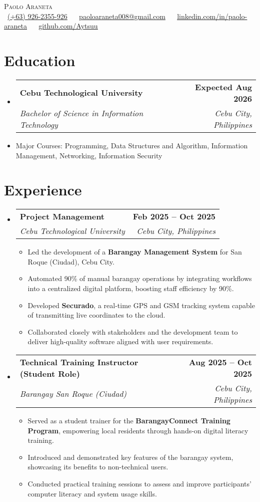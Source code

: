 \documentclass[letterpaper,11pt]{article}
\makeatletter
\newcommand{\resumeItem}[1]{
  \item\small{
    {#1 \vspace{0pt}}
  }
}
\newcommand{\resumeSubheading}[4]{
  \vspace{-2pt}\item
    \begin{tabular*}{1.0\textwidth}[t]{l@{\extracolsep{\fill}}r}
      \textbf{#1} & \textbf{\small #2} \\
      \textit{\small#3} & \textit{\small #4} \\
    \end{tabular*}\vspace{-7pt}
}
\newcommand{\resumeSubHeadingListStart}{\begin{itemize}[leftmargin=0.0in, label={}]}
\newcommand{\resumeSubHeadingListEnd}{\end{itemize}}\vspace{0pt}
\newcommand{\resumeItemListStart}{\begin{itemize}}
\newcommand{\resumeItemListEnd}{\end{itemize}\vspace{-5pt}}
\makeatother
\begin{document}
\begin{center}
    {\Large \scshape Paolo Araneta} \\[2mm]
    \footnotesize \raisebox{-0.1\height}
    \faPhone\ \underline{(+63) 926-2355-926} ~ 
    {\faEnvelope\  \underline{paoloaraneta008@gmail.com}} ~ 
    {\faLinkedin\ \underline{\href{https://www.linkedin.com/in/paolo-araneta-65b332336/}{linkedin.com/in/paolo-araneta}}} ~
    {\faGithub\ \underline{\href{https://github.com/Aytsuu}{github.com/Aytsuu}}} ~
\end{center}

\section{Education}
  \resumeSubHeadingListStart
    \resumeSubheading
      {Cebu Technological University}{Expected Aug 2026}
      {Bachelor of Science in Information Technology
      }{Cebu City, Philippines}
  \resumeSubHeadingListEnd
    \resumeItemListStart
        \vspace{-7pt}
        \resumeItem {Major Courses: Programming, Data Structures and Algorithm, Information Management, Networking, Information Security}
    \resumeItemListEnd
    \vspace{-12pt}
\section{Experience}
    \resumeSubHeadingListStart
      \resumeSubheading{Project Management}{Feb 2025 -- Oct 2025}{Cebu Technological University}{Cebu City, Philippines} 
        \resumeItemListStart
          \resumeItem{Led the development of a \textbf{Barangay Management System} for San Roque (Ciudad), Cebu City.}
          \resumeItem{Automated 90\% of manual barangay operations by integrating workflows into a centralized digital platform, boosting staff efficiency by 90\%.}
          \resumeItem{Developed \textbf{Securado}, a real-time GPS and GSM tracking system capable of transmitting live coordinates to the cloud.}
          \resumeItem{Collaborated closely with stakeholders and the development team to deliver high-quality software aligned with user requirements.}
        \resumeItemListEnd
      \resumeSubheading{Technical Training Instructor (Student Role)}{Aug 2025 -- Oct 2025}{Barangay San Roque (Ciudad)}{Cebu City, Philippines} 
        \resumeItemListStart
          \resumeItem{Served as a student trainer for the \textbf{BarangayConnect Training Program}, empowering local residents through hands-on digital literacy training.}
          \resumeItem{Introduced and demonstrated key features of the barangay system, showcasing its benefits to non-technical users.}
          \resumeItem{Conducted practical training sessions to assess and improve participants' computer literacy and system usage skills.}
        \resumeItemListEnd
    \resumeSubHeadingListEnd
    \vspace{-12pt}
\end{document}

